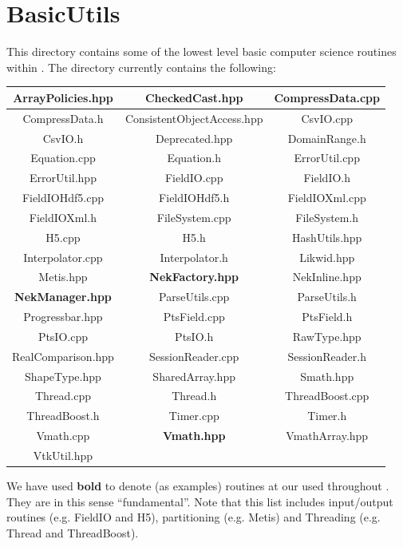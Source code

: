 %
\section{BasicUtils}

This directory contains some of the lowest level basic computer science routines within {\nek}.  
 The directory currently contains the following:
 
\begin{center}
\begin{tabular}{|c | c | c |} \hline
ArrayPolicies.hpp & CheckedCast.hpp &	CompressData.cpp	\\ \hline
CompressData.h & ConsistentObjectAccess.hpp & CsvIO.cpp	\\ \hline
CsvIO.h &	 Deprecated.hpp & DomainRange.h \\ \hline
Equation.cpp & Equation.h & ErrorUtil.cpp	\\ \hline
ErrorUtil.hpp & FieldIO.cpp & FieldIO.h	\\ \hline
FieldIOHdf5.cpp & FieldIOHdf5.h & FieldIOXml.cpp \\ \hline
FieldIOXml.h & FileSystem.cpp	& FileSystem.h	\\ \hline
H5.cpp & H5.h & HashUtils.hpp			\\ \hline
Interpolator.cpp & Interpolator.h & Likwid.hpp \\ \hline
Metis.hpp & {\bf NekFactory.hpp} & NekInline.hpp \\ \hline
{\bf NekManager.hpp} & ParseUtils.cpp & ParseUtils.h \\ \hline
Progressbar.hpp & PtsField.cpp & PtsField.h \\ \hline
PtsIO.cpp & PtsIO.h & RawType.hpp \\ \hline
RealComparison.hpp & SessionReader.cpp & SessionReader.h \\ \hline
ShapeType.hpp & SharedArray.hpp & Smath.hpp \\ \hline
Thread.cpp & Thread.h & ThreadBoost.cpp \\ \hline
ThreadBoost.h & Timer.cpp & Timer.h \\ \hline
Vmath.cpp & {\bf Vmath.hpp} & VmathArray.hpp \\ \hline
VtkUtil.hpp & & \\ \hline
\end{tabular}
\end{center}

We have used {\bf bold} to denote (as examples) routines at our used throughout {\nek}.  They are in this sense ``fundamental''.
Note that this list includes input/output routines (e.g. FieldIO and H5), partitioning (e.g. Metis) and Threading (e.g. Thread and ThreadBoost).
